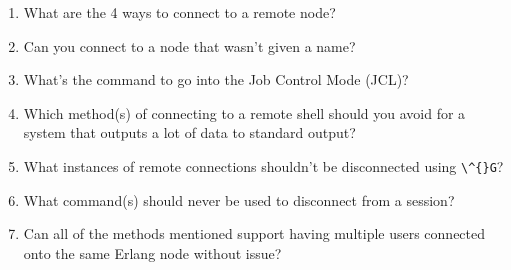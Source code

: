 \documentclass[11pt, oneside]{book}   	%
\newcommand{\command}[1]{\Verb`#1`}
\begin{document}
\begin{enumerate}
	\item What are the 4 ways to connect to a remote node?
	\item Can you connect to a node that wasn't given a name?
	\item What's the command to go into the Job Control Mode (JCL)?
	\item Which method(s) of connecting to a remote shell should you avoid for a system that outputs a lot of data to standard output?
	\item What instances of remote connections shouldn't be disconnected using \command{\^{}G}?
	\item What command(s) should never be used to disconnect from a session?
	\item Can all of the methods mentioned support having multiple users connected onto the same Erlang node without issue?
\end{enumerate}


\end{document}
